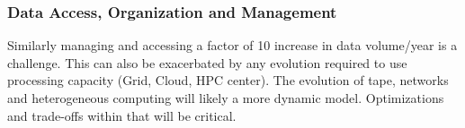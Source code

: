 \begin{frame}
\frametitle{Data Access, Organization and Management}
Similarly managing and accessing a factor of 10 increase in data volume/year is a challenge. 
\vskip 0.15in
This can also be exacerbated by any evolution required to use processing capacity (Grid, Cloud, HPC center). The evolution of tape, networks and heterogeneous computing will likely a more dynamic model. Optimizations and trade-offs within that will be critical.

\end{frame}


